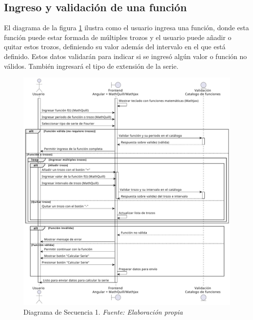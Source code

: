 \subsection{Ingreso y validación de una función}
El diagrama de  la figura \ref{fig:Diagrama_secuencia_1} ilustra como el usuario ingresa una función, donde esta función puede estar formada de múltiples trozos y el usuario puede añadir o quitar estos trozos, definiendo su valor además del intervalo en el que está definido. Estos datos validarán para indicar si se ingresó algún valor o función no válidos. También ingresará el tipo de extensión de la serie.
\begin{figure}[H]
	\centering
	\includegraphics[width=1\textwidth]{img/chapter04/DS1.pdf}
	\caption[Diagrama de Secuencia 1.]{Diagrama de Secuencia 1. \textit{Fuente: \textit{Elaboración propia}}}
	\label{fig:Diagrama_secuencia_1}
\end{figure}


